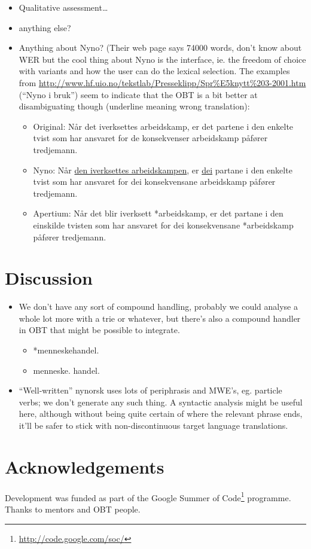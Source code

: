 \documentclass[11pt]{article}
\begin{document}
\begin{itemize}
\item Qualitative assessment\ldots{}
\item anything else?
\item Anything about Nyno? (Their web page says 74000 words, don't know
  about WER but the cool thing about Nyno is the interface, ie. the
  freedom of choice with variants and how the user can do the lexical
  selection. The examples from
  \href{http://www.hf.uio.no/tekstlab/Presseklipp/Spr%E5knytt%203-2001.htm}{http://www.hf.uio.no/tekstlab/Presseklipp/Spr\%E5knytt\%203-2001.htm}
  (``Nyno i bruk'') seem to indicate that the OBT is a bit better at
  disambiguating though (underline meaning wrong translation):

\begin{itemize}
\item Original: Når det iverksettes arbeidskamp, er det partene i den
    enkelte tvist som har ansvaret for de konsekvenser arbeidskamp
    påfører tredjemann.
\item Nyno: Når \underline{den iverksettes arbeidskampen}, er \underline{dei} partane i den
    enkelte tvist som har ansvaret for dei konsekvensane arbeidskamp
    påfører tredjemann.
\item Apertium: Når det blir iverksett *arbeidskamp, er det partane i
    den einskilde tvisten som har ansvaret for dei konsekvensane
    *arbeidskamp påfører tredjemann.
\end{itemize}

\end{itemize}
\section{Discussion}
\label{sec-5}

\begin{itemize}
\item We don't have any sort of compound handling, probably we could
  analyse a whole lot more with a trie or whatever, but there's also a
  compound handler in OBT that might be possible to integrate.

\begin{itemize}
\item *menneskehandel.
\item menneske. handel.
\end{itemize}

\item ``Well-written'' nynorsk uses lots of periphrasis and MWE's, eg. particle
  verbs; we don't generate any such thing. A syntactic analysis might
  be useful here, although without being quite certain of where the
  relevant phrase ends, it'll be safer to stick with non-discontinuous
  target language translations.
\end{itemize}
\section{Acknowledgements}
\label{sec-6}

Development was funded as part of the Google Summer of Code\footnote{\href{http://code.google.com/soc/}{http://code.google.com/soc/} }
programme. Thanks to mentors and OBT people.



\end{document}
